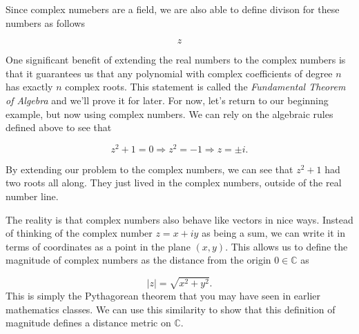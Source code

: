 \documentclass[12pt]{article}
\newcommand{\bbN}{\mathbb{N}}
\newcommand{\bbC}{\mathbb{C}}
\newcommand{\abs}[1]{ \left| #1 \right| }
\theoremstyle{definition}
\theoremstyle{remark}
\numberwithin{equation}{section}
\begin{document}
Since complex numebers are a field, we are also able to define divison for these numbers as follows

\begin{equation}
  z %
\end{equation}



One significant benefit of extending the real numbers to the complex numbers is that it guarantees us that any polynomial with complex coefficients of degree $n$ has exactly $n$ complex roots. This statement is called the \emph{Fundamental Theorem of Algebra} and we'll prove it for later. For now, let's return to our beginning example, but now using complex numbers. We can rely on the algebraic rules defined above to see that

\begin{equation}
  z^2 + 1 = 0 \Rightarrow z^2 = -1 \Rightarrow z = \pm i.
\end{equation}

By extending our problem to the complex numbers, we can see that $z^2 + 1$ had two roots all along. They just lived in the complex numbers, outside of the real number line.



The reality is that complex numbers also behave like vectors in nice ways. Instead of thinking of the complex number $z = x + iy$ as being a sum, we can write it in terms of coordinates as a point in the plane $(x,y)$. This allows us to define the magnitude of complex numbers as the distance from the origin $0 \in \bbC$ as

\begin{equation}
\abs{z} = \sqrt{x^2 + y^2}.
\end{equation}
This is simply the Pythagorean theorem that you may have seen in earlier mathematics classes. We can use this similarity to show that this definition of magnitude defines a distance metric on $\bbC$.
\end{document}
